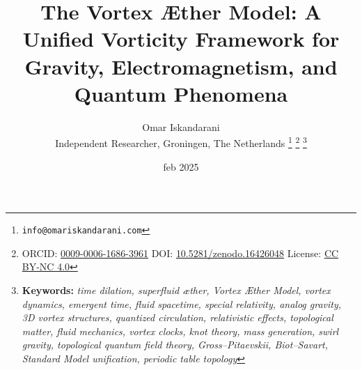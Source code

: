 \documentclass[a4paper,10pt]{article}
\begin{document}
    \title{The Vortex Æther Model: A Unified Vorticity Framework for Gravity, Electromagnetism, and Quantum Phenomena}
    \date{feb 2025}
    \author{
        Omar Iskandarani\\
        \small Independent Researcher, Groningen, The Netherlands
        \thanks{\texttt{info@omariskandarani.com}}
        \thanks{ORCID: \href{https://orcid.org/0009-0006-1686-3961}{0009-0006-1686-3961} \quad DOI: \href{https://doi.org/10.5281/zenodo.16426048}{10.5281/zenodo.16426048} \quad License: \href{https://creativecommons.org/licenses/by/4.0/}{CC BY-NC 4.0}}
        \noindent\thanks{\textbf{Keywords:} \textit{time dilation, superfluid æther, Vortex Æther Model, vortex dynamics, emergent time, fluid spacetime, special relativity, analog gravity, 3D vortex structures, quantized circulation, relativistic effects, topological matter, fluid mechanics, vortex clocks, knot theory, mass generation, swirl gravity, topological quantum field theory, Gross--Pitaevskii, Biot--Savart, Standard Model unification, periodic table topology}}
    }
    \maketitle
\end{document}
